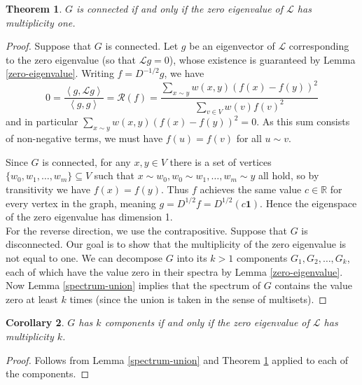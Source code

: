 \documentclass[a4paper,11pt]{article}
\newtheorem{theorem}{Theorem}[section]
\newtheorem{corollary}[theorem]{Corollary}
\theoremstyle{definition}
\renewcommand{\L}{\mathcal{L}}
\newcommand{\rayleigh}[1]{\mathcal{R}\left(#1\right)}
\newcommand{\rayleighfull}[1]{\frac{\sum_{x \sim y} w(x, y)\left(#1(x) - #1(y)\right)^2}{\sum_{v \in V} w(v)#1(v)^2}}
\newcommand{\inner}[2]{\left\langle #1, #2 \right\rangle}
\begin{document}
\begin{theorem}\label{zero-eigenvalue-multiplicity}
$G$ is connected if and only if the zero eigenvalue of $\L$ has multiplicity one.
\end{theorem}
\begin{proof}
Suppose that $G$ is connected. Let $g$ be an eigenvector of $\L$ corresponding to the zero eigenvalue (so that $\L g = 0$), whose existence is guaranteed by Lemma \ref{zero-eigenvalue}. Writing $f = D^{-1/2}g$, we have 
\[
0 = \frac{\inner{g}{\L g}}{\inner{g}{g}} = \rayleigh{f} = \rayleighfull{f}
\] and in particular $\sum_{x \sim y} w(x, y)(f(x) - f(y))^2 = 0$. As this sum consists of non-negative terms, we must have $f(u) = f(v)$ for all $u \sim v$.

Since $G$ is connected, for any $x, y \in V$ there is a set of vertices $\{w_0, w_1, \dots, w_m\} \subseteq V$ such that $x \sim w_0, w_0 \sim w_1, \dots, w_m \sim y$ all hold, so by transitivity we have $f(x) = f(y)$. Thus $f$ achieves the same value $c \in \mathbb{R}$ for every vertex in the graph, meaning $g = D^{1/2}f = D^{1/2}(c\bm{1})$. Hence the eigenspace of the zero eigenvalue has dimension 1. \\

For the reverse direction, we use the contrapositive. Suppose that $G$ is disconnected. Our goal is to show that the multiplicity of the zero eigenvalue is not equal to one. We can decompose $G$ into its $k > 1$ components $G_1, G_2, \ldots, G_k$, each of which have the value zero in their spectra by Lemma \ref{zero-eigenvalue}. Now Lemma \ref{spectrum-union} implies that the spectrum of $G$ contains the value zero at least $k$ times (since the union is taken in the sense of multisets).
\end{proof}

\begin{corollary}
$G$ has $k$ components if and only if the zero eigenvalue of $\L$ has multiplicity $k$.
\end{corollary}
\begin{proof}
Follows from Lemma \ref{spectrum-union} and Theorem \ref{zero-eigenvalue-multiplicity} applied to each of the components.
\end{proof}
\end{document}
